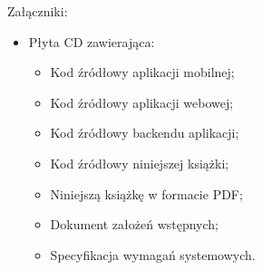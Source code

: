 \newpage
Załączniki:
\begin{itemize}
    \item Płyta CD zawierająca: \begin{itemize}
    \item Kod źródłowy aplikacji mobilnej;
    \item Kod źródłowy aplikacji webowej;
    \item Kod źródłowy backendu aplikacji;
    \item Kod źródłowy niniejszej książki;
    \item Niniejszą książkę w formacie PDF;
    \item Dokument założeń wstępnych;
    \item Specyfikacja wymagań systemowych.
                                    \end{itemize}
\end{itemize}